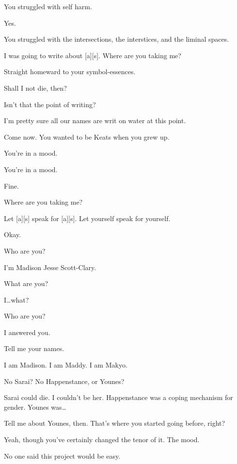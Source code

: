 \begin{paracol}{2}
\begin{leftcolumn}
\begin{ally}
You struggled with self harm.
\end{ally}
Yes.

\begin{ally}
You struggled with the intersections, the interstices, and the liminal spaces.
\end{ally}
I was going to write about {[}a{]}{[}s{]}. Where are you taking me?

\begin{ally}
Straight homeward to your symbol-essences.
\end{ally}
Shall I not die, then?

\begin{ally}
Isn't that the point of writing?
\end{ally}
I'm pretty sure all our names are writ on water at this point.

\begin{ally}
Come now. You wanted to be Keats when you grew up.
\end{ally}
You're in a mood.

\begin{ally}
You're in a mood.
\end{ally}
Fine.

Where are you taking me?

\begin{ally}
Let {[}a{]}{[}s{]} speak for {[}a{]}{[}s{]}. Let yourself speak for yourself.
\end{ally}
Okay.
\newpage



\begin{ally}
Who are you?
\end{ally}
I'm Madison Jesse Scott-Clary.

\begin{ally}
What are you?
\end{ally}
I\ldots{}what?

\begin{ally}
Who are you?
\end{ally}
I answered you.

\begin{ally}
Tell me your names.
\end{ally}
I am Madison. I am Maddy. I am Makyo.

\begin{ally}
No Sarai? No Happenstance, or Younes?
\end{ally}
Sarai could die. I couldn't be her. Happenstance was a coping mechanism for gender. Younes was\ldots{}

\begin{ally}
Tell me about Younes, then. That's where you started going before, right?
\end{ally}
Yeah, though you've certainly changed the tenor of it. The mood.

\begin{ally}
No one said this project would be easy.
\end{ally}
\newpage
\end{leftcolumn}
\end{paracol}
